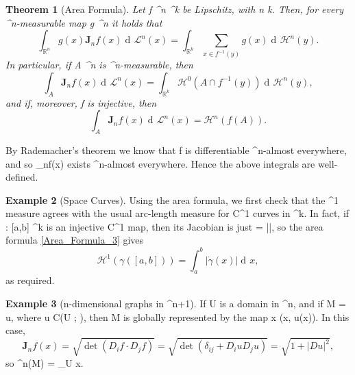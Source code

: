 \documentclass[a4paper, 11pt]{article}
\theoremstyle{plain}
\newtheorem{theorem}{Theorem}[section]
\theoremstyle{definition}
\newtheorem{example}[theorem]{Example}
\theoremstyle{remark}
\DeclareMathOperator{\diff}{d \!}
\DeclareMathOperator{\graph}{graph}
\numberwithin{equation}{subsection}
\def\({}
\def\){}
\begin{document}
\begin{theorem}[Area Formula]
Let \(f \vcentcolon {}^n \rightarrow {}^k\) be Lipschitz, with \(n \leqslant k\). Then, for every \(^n\)-measurable map \(g \vcentcolon {}^n \rightarrow {}\) it holds that
\begin{equation}
\int_{\mathbb{R}^{n}}g(x)\mathbf{J}_{n}f(x)\diff\mathcal{L}^{n}(x) = \int_{\mathbb{R}^{k}}\sum_{x \in f^{-1}(y)}g(x)\diff \mathcal{H}^{n}(y).
\end{equation}
In particular, if \(A \subset {}^{n}\) is \(^{n}\)-measurable, then
\begin{equation}
\int_{A}\mathbf{J}_{n}f(x)\diff\mathcal{L}^{n}(x) = \int_{\mathbb{R}^{k}}\mathcal{H}^{0}(A \cap f^{-1}(y))\diff \mathcal{H}^{n}(y),
\end{equation}
and if, moreover, \(f\) is injective, then
\begin{equation}
\label{Area_Formula_3}
\int_{A}\mathbf{J}_{n}f(x)\diff\mathcal{L}^{n}(x) = \mathcal{H}^{n}(f(A)).
\end{equation}
\end{theorem}
By Rademacher's theorem we know that \(f\) is differentiable \(^{n}\)-almost everywhere, and so \(_{n}f(x)\) exists \(^{n}\)-almost everywhere. Hence the above integrals are well-defined.

\begin{example}[Space Curves]
Using the area formula, we first check that the \(^1\) measure agrees with the usual arc-length measure for \(C^1\) curves in \(^{k}\). In fact, if \(\gamma : [a,b] \rightarrow {}^{k}\) is an injective \(C^1\) map, then its Jacobian is just \( = |\dot{\gamma}|\), so the area formula \eqref{Area_Formula_3} gives
\begin{equation}
\mathcal{H}^1(\gamma([a,b])) = \int_{a}^{b}|\dot{\gamma}(x)|\diff x,
\end{equation}
as required.
\end{example}


\begin{example}[\(n\)-dimensional graphs in \(^{n+1}\)]
If \(U\) is a domain in \(^n\), and if \(M = \graph u\), where \(u \in C(U ; )\), then \(M\) is globally represented by the map \(x  (x, u(x))\). In this case,
\begin{equation}
\mathbf{J}_{n}f(x) = \sqrt{\det(D_{i}f \cdot D_{j}f)} = \sqrt{\det(\delta_{ij} + D_i u D_j u)} = \sqrt{1 + |Du|^2},
\end{equation}
so \(^n(M) = \int_U \diff x\).
\end{example}
\end{document}
